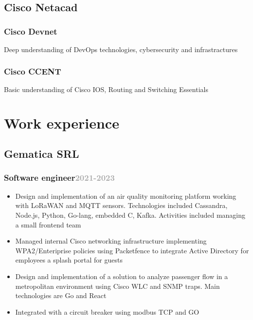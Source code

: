 \documentclass[10pt,a4paper]{article}
\begin{document}

  \subsection{Cisco Netacad}
  \subsubsection{Cisco Devnet} Deep understanding of DevOps technologies, cybersecurity and infrastractures
  \subsubsection{Cisco CCENT} Basic understanding of Cisco IOS, Routing and Switching Essentials

  \section*{Work experience}
  \subsection{Gematica SRL}
  \subsubsection{Software engineer\hfill \textcolor{darkgray}{\small{2021-2023}}}
  \begin{itemize}
    \item Design and implementation of an air quality monitoring platform working with LoRaWAN and MQTT sensors. Technologies included Cassandra, Node.js, Python, Go-lang, embedded C, Kafka. Activities included managing a small frontend team
    \item Managed internal Cisco networking infrastructure implementing WPA2/Enteriprise policies using Packetfence to integrate Active Directory for employees a splash portal for guests
    \item Design and implementation of a solution to analyze passenger flow in a metropolitan environment using Cisco WLC and SNMP traps. Main technologies are Go and React
    \item Integrated with a circuit breaker using modbus TCP and GO
  \end{itemize}
\end{document}
